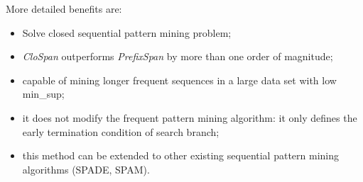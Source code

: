 \documentclass[journal]{IEEEtran}
\begin{document}
More detailed benefits are:
\begin{itemize}
\item Solve closed sequential pattern mining problem;
\item {\it CloSpan} outperforms {\it PrefixSpan} by more than one order of magnitude;
\item capable of mining longer frequent sequences in a large data set with low min\_sup;
\item it does not modify the frequent pattern mining algorithm: it only defines the early termination condition of search branch;
\item this method can be extended to other existing sequential pattern mining algorithms (SPADE, SPAM).
\end{itemize}



\end{document}
